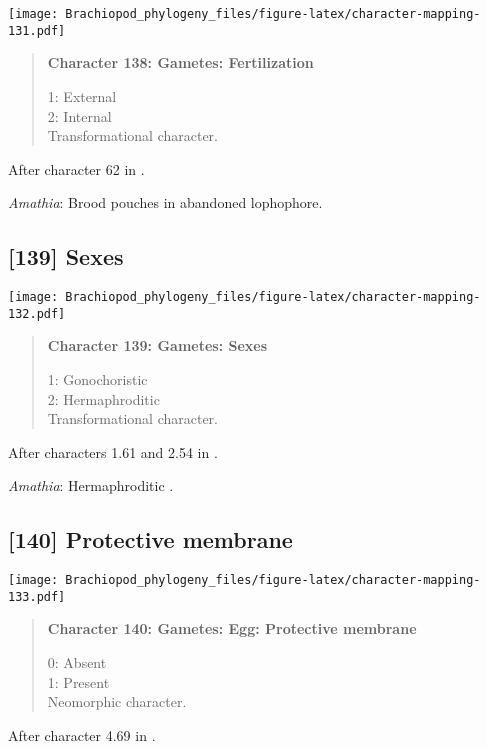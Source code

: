 \documentclass[openany]{book}
\theoremstyle{definition}
\theoremstyle{definition}
\theoremstyle{definition}
\theoremstyle{remark}
\begin{document}
\texttt{[image: Brachiopod\_phylogeny\_files/figure-latex/character-mapping-131.pdf]}

\begin{quote}
\textbf{Character 138: Gametes: Fertilization}

1: External\\
2: Internal\\
Transformational character.
\end{quote}

After character 62 in \citet{Haszprunar2000}.

\hypertarget{Amathia-coding-138}{}
\emph{Amathia}: Brood pouches in abandoned lophophore.

\subsection*{{[}139{]} Sexes}\label{sexes}

\texttt{[image: Brachiopod\_phylogeny\_files/figure-latex/character-mapping-132.pdf]}

\begin{quote}
\textbf{Character 139: Gametes: Sexes}

1: Gonochoristic\\
2: Hermaphroditic\\
Transformational character.
\end{quote}

After characters 1.61 and 2.54 in \citet{SPS1996}.

\hypertarget{Amathia-coding-139}{}
\emph{Amathia}: Hermaphroditic \citep{Reed1988}.

\subsection*{{[}140{]} Protective membrane}\label{protective-membrane}

\texttt{[image: Brachiopod\_phylogeny\_files/figure-latex/character-mapping-133.pdf]}

\begin{quote}
\textbf{Character 140: Gametes: Egg: Protective membrane}

0: Absent\\
1: Present\\
Neomorphic character.
\end{quote}

After character 4.69 in \citet{SPS1996}.
\end{document}
